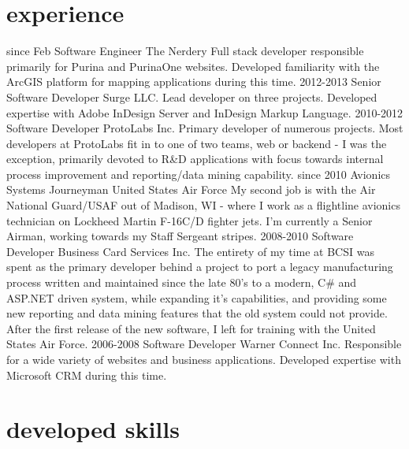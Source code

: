 \documentclass[print]{schoens-cv}
\begin{document}
\section{experience}

\begin{entrylist}
    \entry
         {since Feb}
         {Software Engineer}
         {The Nerdery}
         {Full stack developer responsible primarily for Purina and PurinaOne websites. Developed familiarity with the ArcGIS platform for mapping applications during this time.}
	\entry
		{2012-2013}
		{Senior Software Developer}
		{Surge LLC.}
		{Lead developer on three projects. Developed expertise with Adobe InDesign Server and %
		 InDesign Markup Language.}
	\entry
		{2010-2012}
		{Software Developer}
		{ProtoLabs Inc.}
		{Primary developer of numerous projects. Most developers at ProtoLabs fit in to one of two teams, %
		 web or backend - I was the exception, primarily devoted to R\&D applications with focus towards %
		 internal process improvement and reporting/data mining capability.}
	\entry
		{since 2010}
		{Avionics Systems Journeyman}
		{United States Air Force}
		{My second job is with the Air National Guard/USAF out of Madison, WI - where I work as a flightline %
		 avionics technician on Lockheed Martin F-16C/D fighter jets. I'm currently a Senior Airman, working %
		 towards my Staff Sergeant stripes.}
	\entry
		{2008-2010}
		{Software Developer}
		{Business Card Services Inc.}
		{The entirety of my time at BCSI was spent as the primary developer behind a project to port a %
		 legacy manufacturing process written and maintained since the late 80's to a modern, C\# and ASP.NET %
		 driven system, while expanding it's capabilities, and providing some new reporting and data mining %
		 features that the old system could not provide. After the first release of the new software, I left %
		 for training with the United States Air Force.}
	\entry
		{2006-2008}
		{Software Developer}
		{Warner Connect Inc.}
		{Responsible for a wide variety of websites and business applications. Developed expertise with Microsoft CRM during this time.}
\end{entrylist}

\section{developed skills}
\end{document}
